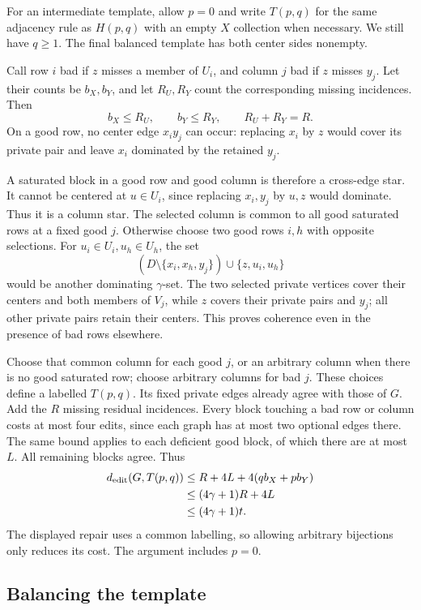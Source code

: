 \documentclass[11pt]{article}
\theoremstyle{definition}
\theoremstyle{remark}
\begin{document}
For an intermediate template, allow $p=0$ and write $T(p,q)$ for the
same adjacency rule as $H(p,q)$ with an empty $X$ collection when
necessary. We still have $q\ge1$. The final balanced template has
both center sides nonempty.

Call row $i$ bad if $z$ misses a member of $U_i$, and column $j$ bad
if $z$ misses $y_j$. Let their counts be $b_X,b_Y$, and let $R_U,R_Y$
count the corresponding missing incidences. Then
\[
 b_X\le R_U,\qquad b_Y\le R_Y,\qquad R_U+R_Y=R.
\]
On a good row, no center edge $x_i y_j$ can occur: replacing $x_i$ by
$z$ would cover its private pair and leave $x_i$ dominated by the
retained $y_j$.

A saturated block in a good row and good column is therefore a
cross-edge star. It cannot be centered at $u\in U_i$, since replacing
$x_i,y_j$ by $u,z$ would dominate. Thus it is a column star.
The selected column is common to all good saturated rows at a fixed
good $j$. Otherwise choose two good rows $i,h$ with opposite selections.
For $u_i\in U_i,u_h\in U_h$, the set
\[
 (D\setminus\{x_i,x_h,y_j\})\cup\{z,u_i,u_h\}
\]
would be another dominating $\gamma$-set. The two selected private
vertices cover their centers and both members of $V_j$, while $z$
covers their private pairs and $y_j$; all other private pairs retain
their centers. This proves coherence even in the presence of bad rows
elsewhere.

Choose that common column for each good $j$, or an arbitrary column
when there is no good saturated row; choose arbitrary columns for bad
$j$. These choices define a labelled $T(p,q)$. Its fixed private edges
already agree with those of $G$. Add the $R$ missing residual incidences.
Every block touching a bad row or column costs at most four edits,
since each graph has at most two optional edges there. The same bound
applies to each deficient good block, of which there are at most $L$.
All remaining blocks agree. Thus
\begin{align}
 d_{\mathrm{edit}}(G,T(p,q))
 &\le R+4L+4(qb_X+pb_Y)\notag\\
 &\le (4\gamma+1)R+4L\notag\\
 &\le (4\gamma+1)t.\label{eq:repair}
\end{align}
The displayed repair uses a common labelling, so allowing arbitrary
bijections only reduces its cost. The argument includes $p=0$.

\subsection{Balancing the template}
\end{document}
